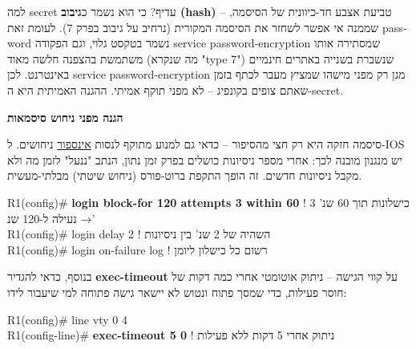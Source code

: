 \documentclass[11pt]{article}
\newcommand{\enLR}[1]{\textenglish{#1}}
\newcommand{\code}[1]{\textenglish{\codefont #1}}
\newcommand{\subheading}[1]{\vskip6pt{\bfseries\color{h3}#1\par}\vskip2pt}
\begin{document}
למה \code{secret} עדיף? כי הוא נשמר כ\textbf{גיבוב \enLR{(hash)}} – טביעת אצבע חד-כיוונית של הסיסמה, שממנה אי אפשר לשחזר את הסיסמה המקורית (נרחיב על גיבוב בפרק \enLR{7).} לעומת זאת \code{password} נשמר בטקסט גלוי, וגם הפקודה \code{service password-encryption} שמסתירה אותו משתמשת בהצפנה חלשה מאוד (מה שנקרא "\enLR{type 7")} שנשברת בשנייה באתרים חינמיים באינטרנט. לכן \code{service password-encryption} מגן רק מפני מישהו שמציץ מעבר לכתף בזמן שאתם צופים בקונפיג – לא מפני תוקף אמיתי. ההגנה האמיתית היא ה-\code{secret}.\par

\subheading{הגנה מפני ניחוש סיסמאות}

סיסמה חזקה היא רק חצי מהסיפור – כדאי גם למנוע מתוקף לנסות \underline{אינספור} ניחושים. ל-\enLR{IOS} יש מנגנון מובנה לכך: אחרי מספר ניסיונות כושלים בפרק זמן נתון, הנתב "ננעל" לזמן מה ולא מקבל ניסיונות חדשים. זה הופך התקפת ברוט-פורס (ניחוש שיטתי) מבלתי-מעשית.\par

\begin{codebox}\begin{english}\codefont\footnotesize\color{cfg}\setlength{\parindent}{0pt}
R1(config)\# \textcolor{cbold}{\textbf{login block-for 120 attempts 3 within 60}}  \textcolor{ccom}{\texthebrew{! \enLR{3} כישלונות תוך \enLR{60} שנ' → נעילה ל-\enLR{120} שנ'}}\\
R1(config)\# login delay 2                              \textcolor{ccom}{\texthebrew{! השהיה של \enLR{2} שנ' בין ניסיונות}}\\
R1(config)\# login on-failure log                       \textcolor{ccom}{\texthebrew{! רשום כל כישלון ליומן}}
\end{english}\end{codebox}

בנוסף, כדאי להגדיר \textbf{\enLR{exec-timeout}} על קווי הגישה – ניתוק אוטומטי אחרי כמה דקות של חוסר פעילות, כדי שמסך פתוח ונטוש לא יישאר גישה פתוחה למי שיעבור לידו:\par

\begin{codebox}\begin{english}\codefont\footnotesize\color{cfg}\setlength{\parindent}{0pt}
R1(config)\# line vty 0 4\\
R1(config-line)\# \textcolor{cbold}{\textbf{exec-timeout 5 0}}   \textcolor{ccom}{\texthebrew{! ניתוק אחרי \enLR{5} דקות ללא פעילות}}
\end{english}\end{codebox}
\end{document}

